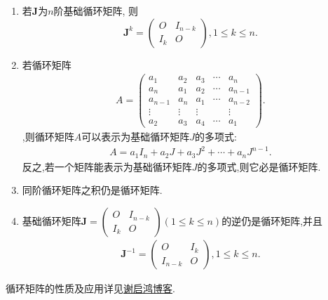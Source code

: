 \documentclass[lang=cn,newtx,10pt,scheme=chinese]{elegantbook}
\begin{document}
\begin{proposition}[循环矩阵的性质]\label{proposition:循环矩阵的性质}
\begin{enumerate}
\item 若$\boldsymbol{J}$为$n$阶基础循环矩阵,
则
\[
\boldsymbol{J}^{k} = 
\begin{pmatrix}
O & I_{n - k} \\
I_{k} & O
\end{pmatrix},  1 \leq k \leq n.
\]
\item 若循环矩阵\begin{align*}
A=\begin{pmatrix}
a_1 & a_2 & a_3 & \cdots & a_n \\
a_n & a_1 & a_2 & \cdots & a_{n - 1} \\
a_{n - 1} & a_n & a_1 & \cdots & a_{n - 2} \\
\vdots & \vdots & \vdots & & \vdots \\
a_2 & a_3 & a_4 & \cdots & a_1
\end{pmatrix}.
\end{align*}
,则循环矩阵$A$可以表示为基础循环矩阵$J$的多项式:
\begin{align*}
A=a_1I_n+a_2J+a_3J^2+\cdots+a_nJ^{n-1}.
\end{align*}
反之,若一个矩阵能表示为基础循环矩阵$J$的多项式,则它必是循环矩阵.
\item \label{example:iten546641856}同阶循环矩阵之积仍是循环矩阵.
\item 基础循环矩阵$\boldsymbol{J}=
\begin{pmatrix}
O & I_{n - k} \\
I_{k} & O
\end{pmatrix} (1 \leq k \leq n)$的逆仍是循环矩阵,并且
\begin{align*}
\boldsymbol{J}^{-1} =\begin{pmatrix}
O & I_{k} \\
I_{n-k} & O
\end{pmatrix},1 \leq k \leq n.
\end{align*}
\end{enumerate}
\end{proposition}
\begin{note}
循环矩阵的性质及应用详见\href{https://www.cnblogs.com/torsor/p/8848641.html}{谢启鸿博客}.
\end{note}
\end{document}
